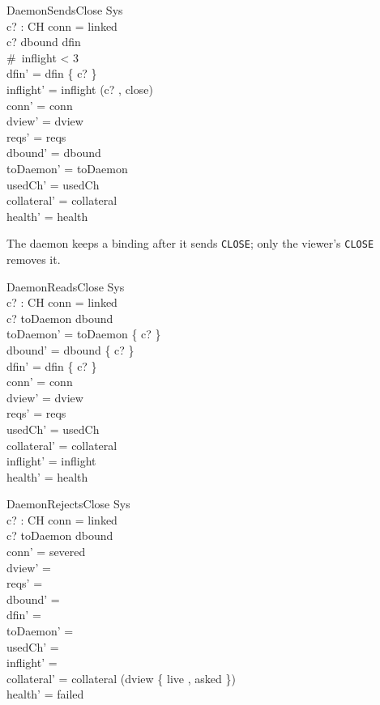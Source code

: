 \documentclass[a4paper,10pt,fleqn]{article}
\begin{document}
\begin{schema}{DaemonSendsClose}
  \Delta Sys \\
  c? : CH
\where
  conn = linked \\
  c? \in dbound \setminus dfin \\
  \#~inflight < 3 \\
  dfin' = dfin \cup \{ c? \} \\
  inflight' = inflight \cat \langle (c? , close) \rangle \\
  conn' = conn \\
  dview' = dview \\
  reqs' = reqs \\
  dbound' = dbound \\
  toDaemon' = toDaemon \\
  usedCh' = usedCh \\
  collateral' = collateral \\
  health' = health
\end{schema}

The daemon keeps a binding after it sends \texttt{CLOSE}; only the viewer's
\texttt{CLOSE} removes it.

\begin{schema}{DaemonReadsClose}
  \Delta Sys \\
  c? : CH
\where
  conn = linked \\
  c? \in toDaemon \cap dbound \\
  toDaemon' = toDaemon \setminus \{ c? \} \\
  dbound' = dbound \setminus \{ c? \} \\
  dfin' = dfin \setminus \{ c? \} \\
  conn' = conn \\
  dview' = dview \\
  reqs' = reqs \\
  usedCh' = usedCh \\
  collateral' = collateral \\
  inflight' = inflight \\
  health' = health
\end{schema}

\begin{schema}{DaemonRejectsClose}
  \Delta Sys \\
  c? : CH
\where
  conn = linked \\
  c? \in toDaemon \setminus dbound \\
  conn' = severed \\
  dview' = \emptyset \\
  reqs' = \emptyset \\
  dbound' = \emptyset \\
  dfin' = \emptyset \\
  toDaemon' = \emptyset \\
  usedCh' = \emptyset \\
  inflight' = \langle \rangle \\
  collateral' = collateral \cup \dom (dview \rres \{ live , asked \}) \\
  health' = failed
\end{schema}
\end{document}

